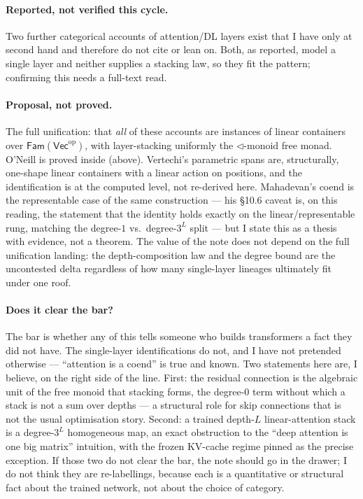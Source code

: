 \documentclass[11pt]{article}
\providecommand{\Vec}{}\renewcommand{\Vec}{\mathsf{Vec}}
\newcommand{\Fam}{\mathsf{Fam}}
\newcommand{\op}{\mathrm{op}}
\theoremstyle{plain}
\theoremstyle{definition}
\begin{document}
\paragraph{Reported, not verified this cycle.} Two further categorical accounts of attention/DL layers exist that
I have only at second hand and therefore do not cite or lean on. Both, as reported, model a single layer and
neither supplies a stacking law, so they fit the pattern; confirming this needs a full-text read.

\paragraph{Proposal, not proved.} The full unification: that \emph{all} of these accounts are instances of linear
containers over $\Fam(\Vec^{\op})$, with layer-stacking uniformly the $\lhd$-monoid free monad. O'Neill is proved
inside (above). Vertechi's parametric spans are, structurally, one-shape linear containers with a linear action on
positions, and the identification is at the computed level, not re-derived here. Mahadevan's coend is the
representable case of the same construction --- his \S10.6 caveat is, on this reading, the statement that the
identity holds exactly on the linear/representable rung, matching the degree-$1$ vs.\ degree-$3^{L}$ split --- but I
state this as a thesis with evidence, not a theorem. The value of the note does not depend on the full unification
landing: the depth-composition law and the degree bound are the uncontested delta regardless of how many single-layer
lineages ultimately fit under one roof.

\paragraph{Does it clear the bar?} The bar is whether any of this tells someone who builds transformers a fact they
did not have. The single-layer identifications do not, and I have not pretended otherwise --- ``attention is a coend''
is true and known. Two statements here are, I believe, on the right side of the line. First: the residual connection
is the algebraic unit of the free monoid that stacking forms, the degree-$0$ term without which a stack is not a sum
over depths --- a structural role for skip connections that is not the usual optimisation story. Second: a trained
depth-$L$ linear-attention stack is a degree-$3^{L}$ homogeneous map, an exact obstruction to the ``deep attention is
one big matrix'' intuition, with the frozen KV-cache regime pinned as the precise exception. If those two do not
clear the bar, the note should go in the drawer; I do not think they are re-labellings, because each is a
quantitative or structural fact about the trained network, not about the choice of category.
\end{document}
